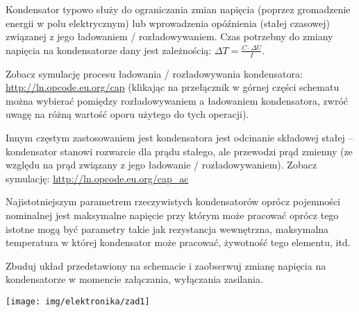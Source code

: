 \documentclass{pdfBooklets}
\begin{document}
Kondensator typowo służy do ograniczania zmian napięcia (poprzez gromadzenie energii w polu elektrycznym) lub wprowadzenia opóźnienia (stałej czasowej) związanej z jego ładowaniem / rozładowywaniem.
Czas potrzebny do zmiany napięcia na kondensatorze dany jest zależnością: $\Delta T = \frac{C \cdot \Delta U}{I}$.

Zobacz symulację procesu ładowania / rozładowywania kondensatora: \url{http://ln.opcode.eu.org/cap}
(klikając na przełącznik w górnej części schematu  można wybierać pomiędzy rozładowywaniem a ładowaniem kondensatora, zwróć uwagę na różną wartość oporu użytego do tych operacji).

Innym częstym zastosowaniem jest kondensatora jest odcinanie składowej stałej – kondensator stanowi rozwarcie dla prądu stałego, ale przewodzi prąd zmienny (ze względu na prąd związany z jego ładowanie / rozładowywaniem).
Zobacz symulację: \url{http://ln.opcode.eu.org/cap_ac}

Najistotniejszym parametrem rzeczywistych kondensatorów oprócz pojemności nominalnej jest maksymalne napięcie przy którym może pracować oprócz tego istotne mogą być parametry takie jak rezystancja wewnętrzna, maksymalna temperatura w której kondensator może pracować, żywotność tego elementu, itd.

\begin{Zadanie}{}{}
\noindent\begin{minipage}[b]{0.55\textwidth}
Zbuduj układ przedstawiony na schemacie i zaobserwuj zmianę napięcia na kondensatorze w momencie załączania, wyłączania zasilania.
\vspace{1cm}
\end{minipage}
\hfill
\begin{minipage}[b]{0.4\textwidth}
\texttt{[image: img/elektronika/zad1]}
\end{minipage}
\end{Zadanie}
\end{document}
